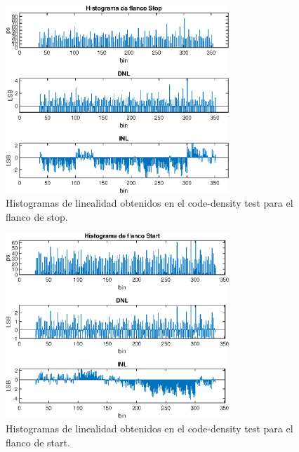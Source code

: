 \begin{figure}[H]
      \centering
      \includegraphics[width=0.75\textwidth]{imagenes/linealidad_stop.eps}
      \caption{Histogramas de linealidad obtenidos en el code-density test para el flanco de stop.}
      \label{fig: linealidad_stop}
\end{figure}

\begin{figure}[H]
      \centering
      \includegraphics[width=0.75\textwidth]{imagenes/linealidad_start.eps}
      \caption{Histogramas de linealidad obtenidos en el code-density test para el flanco de start.}
      \label{fig: linealidad_start}
\end{figure}

\clearpage

